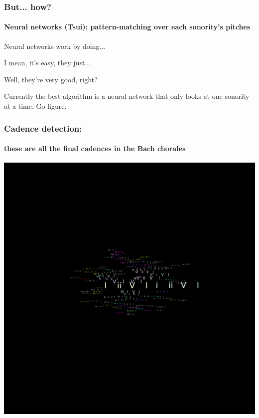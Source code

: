 \documentclass{beamer}
\begin{document}
\begin{frame}
  \frametitle{But... how?}
  \framesubtitle{Neural networks (Tsui): pattern-matching over each sonority's
  pitches}

Neural networks work by doing...
\pause

I mean, it's easy, they just...
\pause

Well, they're very good, right?

\pause
\addvspace{2em}
\begin{small}
  Currently the best algorithm is a neural network that only looks at
  one sonority at a time. \pause Go figure.
\end{small}
\end{frame}


\begin{frame}
  \frametitle{Cadence detection:}
  \framesubtitle{these are all the final cadences in the Bach chorales}
  \centering
  \addvspace{0.5em}
  \includegraphics[scale=0.3, trim = 50em 0em 0em 50em, clip]{figs/cadences}
\end{frame}
\end{document}
